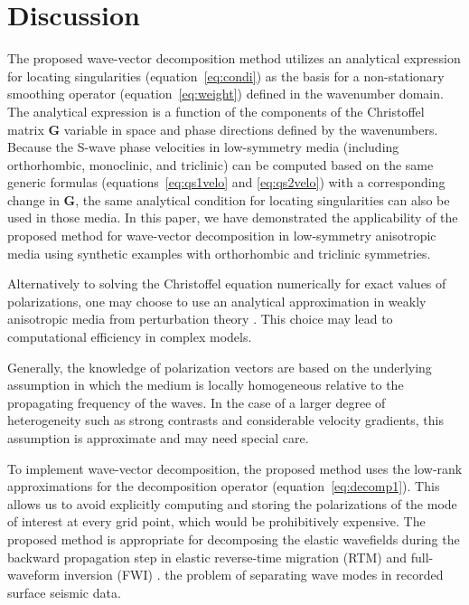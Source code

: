 \section{Discussion}
The proposed wave-vector decomposition method utilizes an analytical expression for locating singularities (equation~\ref{eq:condi}) as the basis for a non-stationary smoothing operator (equation~\ref{eq:weight}) defined  in the wavenumber domain. The analytical expression is a function of the components of the Christoffel matrix $\mathbf{G}$ variable in space and phase directions defined by the wavenumbers. Because the S-wave phase velocities in low-symmetry media (including orthorhombic, monoclinic, and triclinic) can be computed based on the same generic formulas (equations~\ref{eq:qs1velo} and \ref{eq:qs2velo}) with a corresponding change in $\mathbf{G}$, the same analytical condition for locating singularities can also be used in those media. In this paper, we have demonstrated the applicability of the proposed method for wave-vector decomposition in low-symmetry anisotropic media using synthetic examples with orthorhombic and triclinic symmetries.

Alternatively to solving the Christoffel equation numerically for exact values of polarizations, one may choose to use an analytical approximation in weakly anisotropic media  from perturbation theory \cite[]{farra}. This choice may lead to  computational efficiency in complex models. 

Generally, the knowledge of polarization vectors  are based on the underlying assumption in which the medium is  locally homogeneous relative to the propagating frequency of the waves. In the case of a larger degree of heterogeneity such as strong contrasts and considerable velocity gradients, this assumption is approximate and may need special care.

To implement wave-vector decomposition, the proposed method uses the low-rank approximations for the decomposition operator (equation~\ref{eq:decomp1}). This allows us to avoid explicitly computing and storing the polarizations of the mode of interest at every grid point, which would be prohibitively expensive. The proposed method is appropriate for decomposing the elastic wavefields during the backward propagation step in elastic reverse-time migration (RTM) \cite[]{wangcheng} and full-waveform inversion (FWI) \cite[]{wangchengwang}.  the problem of separating wave modes in recorded surface seismic data.

